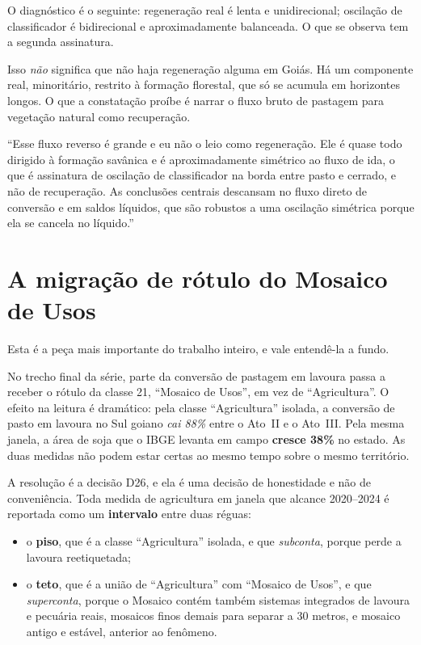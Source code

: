 O diagnóstico é o seguinte: regeneração real é lenta e unidirecional; oscilação
de classificador é bidirecional e aproximadamente balanceada. O que se observa
tem a segunda assinatura.

\begin{naodiz}
Isso \emph{não} significa que não haja regeneração alguma em Goiás. Há um
componente real, minoritário, restrito à formação florestal, que só se acumula
em horizontes longos. O que a constatação proíbe é narrar o fluxo bruto de
pastagem para vegetação natural como recuperação.
\end{naodiz}

\begin{nabanca}
``Esse fluxo reverso é grande e eu não o leio como regeneração. Ele é quase
todo dirigido à formação savânica e é aproximadamente simétrico ao fluxo de
ida, o que é assinatura de oscilação de classificador na borda entre pasto e
cerrado, e não de recuperação. As conclusões centrais descansam no fluxo direto
de conversão e em saldos líquidos, que são robustos a uma oscilação simétrica
porque ela se cancela no líquido.''
\end{nabanca}

\section{A migração de rótulo do Mosaico de Usos}

Esta é a peça mais importante do trabalho inteiro, e vale entendê-la a fundo.

No trecho final da série, parte da conversão de pastagem em lavoura passa a
receber o rótulo da classe 21, ``Mosaico de Usos'', em vez de ``Agricultura''.
O efeito na leitura é dramático: pela classe ``Agricultura'' isolada, a
conversão de pasto em lavoura no Sul goiano \emph{cai 88\%} entre o Ato~II e o
Ato~III. Pela mesma janela, a área de soja que o IBGE levanta em campo
\textbf{cresce 38\%} no estado. As duas medidas não podem estar certas ao mesmo
tempo sobre o mesmo território.

A resolução é a decisão D26, e ela é uma decisão de honestidade e não de
conveniência. Toda medida de agricultura em janela que alcance 2020--2024 é
reportada como um \textbf{intervalo} entre duas réguas:

\begin{itemize}
\item o \textbf{piso}, que é a classe ``Agricultura'' isolada, e que
\emph{subconta}, porque perde a lavoura reetiquetada;
\item o \textbf{teto}, que é a união de ``Agricultura'' com ``Mosaico de
Usos'', e que \emph{superconta}, porque o Mosaico contém também sistemas
integrados de lavoura e pecuária reais, mosaicos finos demais para separar a
30 metros, e mosaico antigo e estável, anterior ao fenômeno.
\end{itemize}

